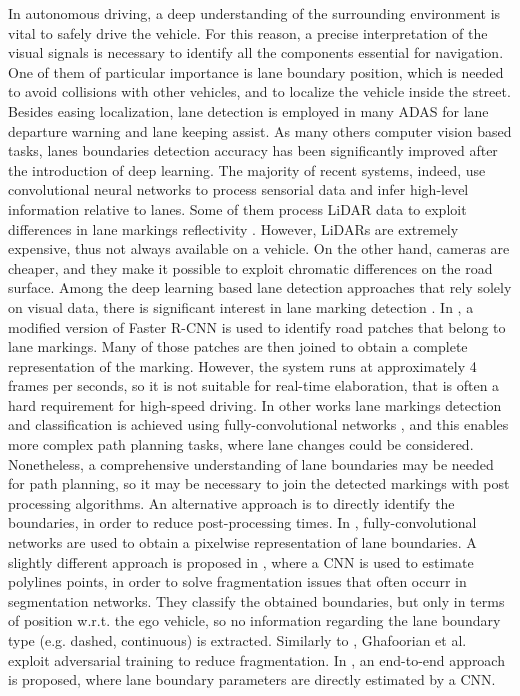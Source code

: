 \documentclass[runningheads]{llncs}
\begin{document}
In autonomous driving, a deep understanding of the surrounding environment is vital to safely drive the vehicle. For this reason, a precise interpretation of the visual signals is necessary to identify all the components essential for navigation. One of them of particular importance is lane boundary position, which is needed to avoid collisions with other vehicles, and to localize the vehicle inside the street. Besides easing localization, lane detection is employed in many ADAS for lane departure warning and lane keeping assist. As many others computer vision based tasks, lanes boundaries detection accuracy has been significantly improved after the introduction of deep learning. The majority of recent systems, indeed, use convolutional neural networks to process sensorial data and infer high-level information relative to lanes. Some of them process LiDAR data to exploit differences in lane markings reflectivity \cite{caltagirone2017fast,bai2018deep}. However, LiDARs are extremely expensive, thus not always available on a vehicle. On the other hand, cameras are cheaper, and they make it possible to exploit chromatic differences on the road surface. Among the deep learning based lane detection approaches that rely solely on visual data, there is significant interest in lane marking detection \cite{DBLP:journals/corr/abs-1809-03994,tian2018lane,li2017deep,Lee2017VPGNetVP,zang2018traffic}. In \cite{tian2018lane}, a modified version of Faster R-CNN \cite{ren2015faster} is used to identify road patches that belong to lane markings. Many of those patches are then joined to obtain a complete representation of the marking. However, the system runs at approximately 4 frames per seconds, so it is not suitable for real-time elaboration, that is often a hard requirement for high-speed driving. In other works \cite{Lee2017VPGNetVP,zang2018traffic,John2018} lane markings detection and classification is achieved using fully-convolutional networks \cite{long2015fully}, and this enables more complex path planning tasks, where lane changes could be considered. Nonetheless, a comprehensive understanding of lane boundaries may be needed for path planning, so it may be necessary to join the detected markings with post processing algorithms. An alternative approach is to directly identify the boundaries, in order to reduce post-processing times. In \cite{neven2018towards,pan2018spatial,zhang2018geometric,kim2017end}, fully-convolutional networks are used to obtain a pixelwise representation of lane boundaries. A slightly different approach is proposed in \cite{Chougule}, where a CNN is used to estimate polylines points, in order to solve fragmentation issues that often occurr in segmentation networks. They classify the obtained boundaries, but only in terms of position w.r.t. the ego vehicle, so no information regarding the lane boundary type (e.g. dashed, continuous) is extracted. Similarly to \cite{Chougule}, Ghafoorian et al. \cite{ghafoorian2018gan} exploit adversarial training to reduce fragmentation. In \cite{wvangansbeke_2019}, an end-to-end approach is proposed, where lane boundary parameters are directly estimated by a CNN.
\end{document}

